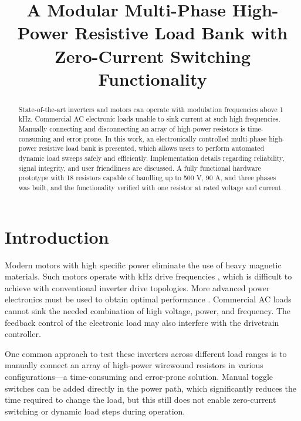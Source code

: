\documentclass{article}
\title{\singlespacing \fontsize{24}{29} A Modular Multi-Phase High-Power Resistive Load Bank with Zero-Current Switching Functionality}
\begin{document}
\maketitle

\begin{abstract}
State-of-the-art inverters and motors can operate with modulation frequencies above 1 kHz. Commercial AC electronic loads unable to sink current at such high frequencies. Manually connecting and disconnecting an array of high-power resistors is time-consuming and error-prone. In this work, an electronically controlled multi-phase high-power resistive load bank is presented, which allows users to perform automated dynamic load sweeps safely and efficiently. Implementation details regarding reliability, signal integrity, and user friendliness are discussed. A fully functional hardware prototype with 18 resistors capable of handling up to 500 V, 90 A, and three phases was built, and the functionality verified with one resistor at rated voltage and current.
\end{abstract}

\vspace{0.5cm}
\section{Introduction}

Modern motors with high specific power eliminate the use of heavy magnetic materials. Such motors operate with kHz drive frequencies \cite{Zhang2019_TIA, Anderson2018_EATS, Yoon2018_EATS, Sayed2021_Journal}, which is difficult to achieve with conventional inverter drive topologies. More advanced power electronics must be used to obtain optimal performance \cite{Pallo2020_APEC, Barth2020_Journal, Modeer2020_TPEL, Horowitz2022_APEC, Horowitz2023_APEC}. Commercial AC loads cannot sink the needed combination of high voltage, power, and frequency. The feedback control of the electronic load may also interfere with the drivetrain controller.

One common approach to test these inverters across different load ranges is to manually connect an array of high-power wirewound resistors in various configurations—a time-consuming and error-prone solution. Manual toggle switches can be added directly in the power path, which significantly reduces the time required to change the load, but this still does not enable zero-current switching or dynamic load steps during operation.
\end{document}
